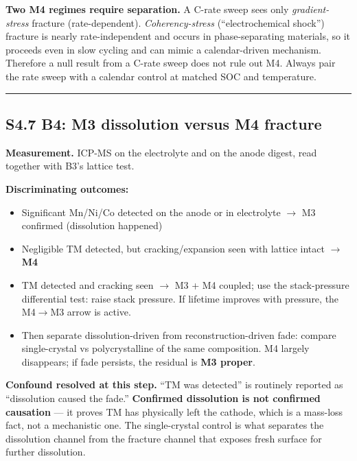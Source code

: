 \documentclass[11pt,a4paper]{article}
\begin{document}
\textbf{Two M4 regimes require separation.} A C-rate sweep sees only \emph{gradient-stress} fracture (rate-dependent). \emph{Coherency-stress} (\textquotedblleft{}electrochemical shock\textquotedblright{}) fracture is nearly rate-independent and occurs in phase-separating materials, so it proceeds even in slow cycling and can mimic a calendar-driven mechanism. Therefore a null result from a C-rate sweep does not rule out M4. Always pair the rate sweep with a calendar control at matched SOC and temperature.


\par\noindent\rule{\linewidth}{0.4pt}\par


\subsection*{S4.7 B4: M3 dissolution versus M4 fracture}


\textbf{Measurement.} ICP-MS on the electrolyte and on the anode digest, read together with B3's lattice test.


\textbf{Discriminating outcomes:}


\begin{itemize}
  \item Significant Mn/Ni/Co detected on the anode or in electrolyte \ensuremath{\rightarrow} M3 confirmed (dissolution happened)
  \item Negligible TM detected, but cracking/expansion seen with lattice intact \ensuremath{\rightarrow} \textbf{M4}
  \item TM detected and cracking seen \ensuremath{\rightarrow} M3 + M4 coupled; use the stack-pressure differential test: raise stack pressure. If lifetime improves with pressure, the M4\ensuremath{\rightarrow}M3 arrow is active.
  \item Then separate dissolution-driven from reconstruction-driven fade: compare single-crystal vs polycrystalline of the same composition. M4 largely disappears; if fade persists, the residual is \textbf{M3 proper}.
\end{itemize}


\textbf{Confound resolved at this step.} \textquotedblleft{}TM was detected\textquotedblright{} is routinely reported as \textquotedblleft{}dissolution caused the fade.\textquotedblright{} \textbf{Confirmed dissolution is not confirmed causation} --- it proves TM has physically left the cathode, which is a mass-loss fact, not a mechanistic one. The single-crystal control is what separates the dissolution channel from the fracture channel that exposes fresh surface for further dissolution.
\end{document}
